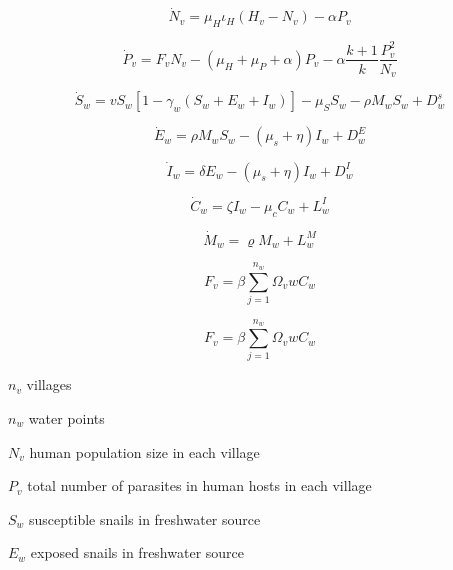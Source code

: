 \documentclass[12pt]{article}
\begin{document}
\begin{equation}\label{eq:PopRateofChange}
\dot{N}_v = \mu_H\iota_H(H_v - N_v) - \alpha P_v
\end{equation}
 
 \begin{equation}\label{eq:ParasiteRateofChange}
 \dot{P}_v = F_vN_v - (\mu_H + \mu_P + \alpha)P_v - \alpha \frac{k +1}{k} \frac{P_v^2}{N_v}
 \end{equation}

\begin{equation}\label{eq:SusceptibleRateofChange}
\dot{S}_w = vS_w [1- \gamma_w (S_w + E_w + I_w)] - \mu_S S_w - \rho M_wS_w + D_w^s
\end{equation}
 
\begin{equation}\label{eq:ExposedRateofChange}
\dot{E}_w = \rho M_wS_w - (\mu_s +\eta) I_w + D_w^E
\end{equation}
 
\begin{equation}\label{eq:InfectedRateofChange}
\dot{I}_w = \delta E_w - (\mu_s +\eta) I_w + D_w^I
\end{equation}
  
\begin{equation}\label{eq:CercariaeRateofChange}
\dot{C}_w = \zeta I_w - \mu_cC_w+  L_w^I
\end{equation}
 
\begin{equation}\label{eq:MiracidiaRateofChange}
\dot{M}_w = \varrho M_w +  L_w^M
\end{equation}
 
\begin{equation}\label{eq:ForceofInfection}
 F_v = \beta \sum_{j=1}^{n_w} \Omega_vw C_w
\end{equation}

\begin{equation}\label{eq:contact matrix}
 F_v = \beta \sum_{j=1}^{n_w} \Omega_vw C_w
\end{equation}

$n_v$ villages

$n_w$ water points

$N_v$ human population size in each village

$P_v$ total number of parasites in human hosts in each village

$S_w$ susceptible snails in freshwater source

$E_w$ exposed snails in freshwater source
\end{document}
